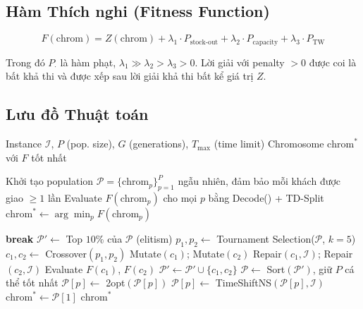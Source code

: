 \documentclass[12pt,a4paper]{article}
\begin{document}
\subsection{Hàm Thích nghi (Fitness Function)}

\begin{equation}
  F(\text{chrom}) = Z(\text{chrom})
                    + \lambda_1 \cdot P_{\text{stock-out}}
                    + \lambda_2 \cdot P_{\text{capacity}}
                    + \lambda_3 \cdot P_{\text{TW}}
\end{equation}

\noindent Trong đó $P_{\cdot}$ là hàm phạt, $\lambda_1 \gg \lambda_2 > \lambda_3 > 0$.
Lời giải với penalty $> 0$ được coi là bất khả thi và được xếp sau lời giải khả thi
bất kể giá trị $Z$.

\newpage
\subsection{Lưu đồ Thuật toán}

\begin{algorithm}[htbp]
\caption{Hybrid Genetic Algorithm cho IRP-TW-DT}
\label{alg:hga}
\begin{algorithmic}[1]
\Require Instance $\mathcal{I}$, $P$ (pop. size), $G$ (generations), $T_{\max}$ (time limit)
\Ensure Chromosome $\text{chrom}^*$ với $F$ tốt nhất

\State Khởi tạo population $\mathcal{P} = \{\text{chrom}_p\}_{p=1}^{P}$ ngẫu nhiên, đảm bảo mỗi khách được giao $\geq 1$ lần
\State Evaluate $F(\text{chrom}_p)$ cho mọi $p$ bằng Decode() + TD-Split
\State $\text{chrom}^* \leftarrow \arg\min_p F(\text{chrom}_p)$

   \textbf{break} \EndIf
  \State $\mathcal{P}' \leftarrow$ Top $10\%$ của $\mathcal{P}$ (elitism)
    \State $p_1, p_2 \leftarrow$ Tournament Selection($\mathcal{P}$, $k=5$)
    \State $c_1, c_2 \leftarrow$ Crossover$(p_1, p_2)$ 
    \State Mutate$(c_1)$; Mutate$(c_2)$
    \State Repair$(c_1, \mathcal{I})$; Repair$(c_2, \mathcal{I})$
    \State Evaluate $F(c_1)$, $F(c_2)$
    \State $\mathcal{P}' \leftarrow \mathcal{P}' \cup \{c_1, c_2\}$
  \EndWhile
  \State $\mathcal{P} \leftarrow$ Sort$(\mathcal{P}')$, giữ $P$ cá thể tốt nhất
   
    \State $\mathcal{P}[p] \leftarrow$ 2opt$(\mathcal{P}[p])$
    \State $\mathcal{P}[p] \leftarrow$ TimeShiftNS$(\mathcal{P}[p], \mathcal{I})$
  \EndFor
    $\text{chrom}^* \leftarrow \mathcal{P}[1]$
  \EndIf
\EndFor
\State \Return $\text{chrom}^*$
\end{algorithmic}
\end{algorithm}
\end{document}
